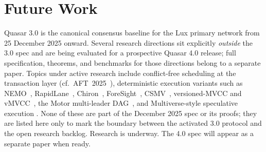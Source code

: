 \section{Future Work}

\label{sec:future}

Quasar 3.0 is the canonical consensus baseline for the Lux primary
network from 25 December 2025 onward. Several research directions sit
explicitly \emph{outside} the 3.0 spec and are being evaluated for a
prospective Quasar 4.0 release; full specification, theorems, and
benchmarks for those directions belong to a separate paper. Topics
under active research include conflict-free scheduling at the
transaction layer (cf.\ AFT~2025~\cite{aft2025-conflict-spec}),
deterministic execution variants such as
NEMO~\cite{nemo}, RapidLane~\cite{rapidlane},
Chiron~\cite{chiron}, ForeSight~\cite{foresight}, CSMV~\cite{csmv},
versioned-MVCC and vMVCC~\cite{vmvcc}, the Motor multi-leader
DAG~\cite{motor}, and Multiverse-style speculative execution
\cite{multiverse}. None of these are part of the December 2025 spec or
its proofs; they are listed here only to mark the boundary between the
activated 3.0 protocol and the open research backlog. Research is
underway. The 4.0 spec will appear as a separate paper when ready.


